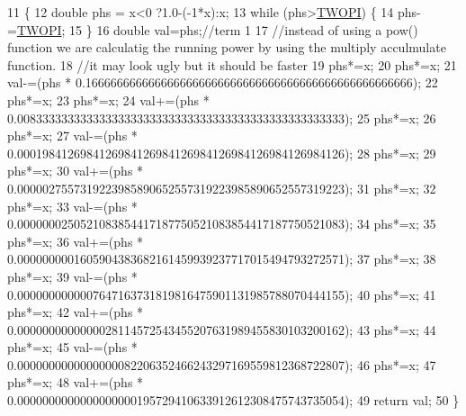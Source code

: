 \begin{DoxyCode}
11                                      \{
12     \textcolor{keywordtype}{double} phs = x<0 ?1.0-(-1*x):x;
13     \textcolor{keywordflow}{while} (phs>\hyperlink{PI_8h_a4912c64aec0c943b7985db6cb61ff83a}{TWOPI}) \{
14         phs-=\hyperlink{PI_8h_a4912c64aec0c943b7985db6cb61ff83a}{TWOPI};
15     \}
16     \textcolor{keywordtype}{double} val=phs;\textcolor{comment}{//term 1}
17     \textcolor{comment}{//instead of using a pow() function we are calculatig the running power by using the multiply
       acculmulate function.}
18     \textcolor{comment}{//it may look ugly but it should be faster}
19     phs*=x;
20     phs*=x;
21     val-=(phs * 0.1666666666666666666666666666666666666666666666666666);
22     phs*=x;
23     phs*=x;
24     val+=(phs * 0.0083333333333333333333333333333333333333333333333333);
25     phs*=x;
26     phs*=x;
27     val-=(phs * 0.0001984126984126984126984126984126984126984126984126);
28     phs*=x;
29     phs*=x;
30     val+=(phs * 0.0000027557319223985890652557319223985890652557319223);
31     phs*=x;
32     phs*=x;
33     val-=(phs * 0.0000000250521083854417187750521083854417187750521083);
34     phs*=x;
35     phs*=x;
36     val+=(phs * 0.0000000001605904383682161459939237717015494793272571);
37     phs*=x;
38     phs*=x;
39     val-=(phs * 0.0000000000007647163731819816475901131985788070444155);
40     phs*=x;
41     phs*=x;
42     val+=(phs * 0.0000000000000028114572543455207631989455830103200162);
43     phs*=x;
44     phs*=x;
45     val-=(phs * 0.0000000000000000082206352466243297169559812368722807);
46     phs*=x;
47     phs*=x;
48     val+=(phs * 0.0000000000000000000195729410633912612308475743735054);
49     \textcolor{keywordflow}{return} val;
50 \}\end{DoxyCode}
